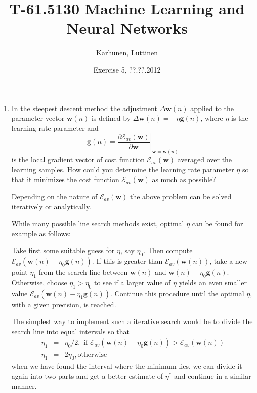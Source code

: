 
\title{T-61.5130 Machine Learning and Neural Networks}
\author{Karhunen, Luttinen}
\date{Exercise 5, ??.??.2012}

\newcommand{\vect}[1]{{\bf{#1}}}
\newcommand{\svect}[1]{\boldsymbol{#1}}
\newcommand{\matr}[1]{\boldsymbol{#1}}




\maketitle

\begin{enumerate}
  
\item In the steepest descent method the adjustment
  $\Delta\mathbf{w}(n)$ applied to the parameter vector
  $\mathbf{w}(n)$ is defined by
  $\Delta\mathbf{w}(n)=-\eta\mathbf{g}(n)$, where $\eta$ is the
  learning-rate parameter and
  \begin{equation*}
    \mathbf{g}(n)=\left.\frac{\partial
        \mathcal{E}_{av}(\mathbf{w})}{\partial \mathbf{w}}\right|_{\mathbf{w}=\mathbf{w}(n)}
  \end{equation*}
  is the local gradient vector of cost
  function $\mathcal{E}_{av}(\mathbf{w})$ averaged over the learning
  samples. How could you determine the learning rate parameter $\eta$ so
  that it minimizes the cost function $\mathcal{E}_{av}(\mathbf{w})$ as much as possible?

  \begin{solution}

    Depending on the nature of $\mathcal{E}_{av}(\mathbf{w})$ the above
    problem can be solved iteratively or analytically.

    While many possible line search methods exist,
    optimal $\eta$ can be found for example as follows:

    Take first some suitable guess for $\eta$, say $\eta_0$. Then compute
    $\mathcal{E}_{av}(\mathbf{w}(n)-\eta_0\mathbf{g}(n))$. If this is
    greater than $\mathcal{E}_{av}(\mathbf{w}(n))$, take a new point
    $\eta_1$ from the search line between $\mathbf{w}(n)$ and
    $\mathbf{w}(n)-\eta_0\mathbf{g}(n)$. Otherwise, choose $\eta_1>\eta_0$
    to see if a larger value of $\eta$ yields an even smaller value
    $\mathcal{E}_{av}(\mathbf{w}(n)-\eta_1\mathbf{g}(n))$. Continue this
    procedure until the optimal $\eta$, with a given precision, is reached.

    The simplest way to implement such a iterative search would be to
    divide the search line into equal intervals so that
    \begin{eqnarray*}
      \eta_1&=&\eta_0/2, \mbox{ if
      }\mathcal{E}_{av}(\mathbf{w}(n)-\eta_0\mathbf{g}(n))>\mathcal{E}_{av}(\mathbf{w}(n))\\
      \eta_1&=&2\eta_0, \mbox{otherwise}
    \end{eqnarray*}
    when we have found the interval where the minimum lies, we can divide
    it again into two parts and get a better estimate of $\eta^*$ and continue in a similar manner.


\end{solution}
\end{enumerate}
